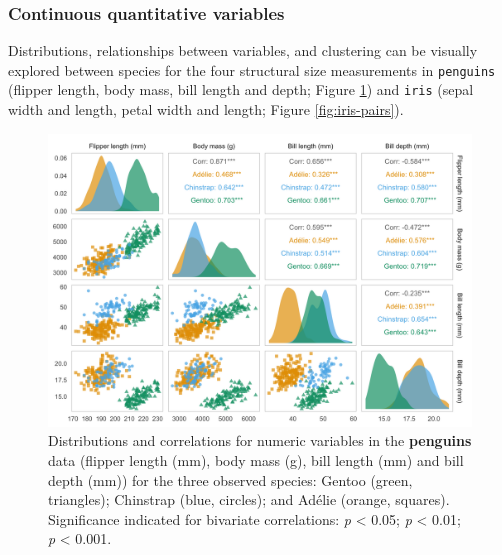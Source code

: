 \hypertarget{continuous-quantitative-variables}{%
\subsubsection{Continuous quantitative
variables}\label{continuous-quantitative-variables}}

Distributions, relationships between variables, and clustering can be
visually explored between species for the four structural size
measurements in \texttt{penguins} (flipper length, body mass, bill
length and depth; Figure \ref{fig:penguin-pairs}) and \texttt{iris}
(sepal width and length, petal width and length; Figure
\ref{fig:iris-pairs}).

\begin{Schunk}
\begin{figure}

{\centering \includegraphics[width=\textwidth]{figs/penguin-pairs-1} 

}

\caption{Distributions and correlations for numeric variables in the \textbf{penguins} data (flipper length (mm), body mass (g), bill length (mm) and bill depth (mm)) for the three observed species: Gentoo (green, triangles); Chinstrap (blue, circles); and Adélie (orange, squares). Significance indicated for bivariate correlations: \text{*}\textit{p} < 0.05; \text{*}\text{*}\textit{p} < 0.01; \text{*}\text{*}\text{*}\textit{p} < 0.001.}\label{fig:penguin-pairs}
\end{figure}
\end{Schunk}

